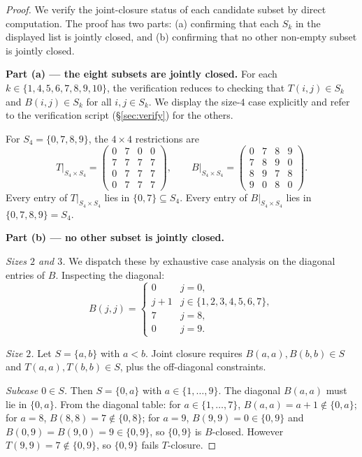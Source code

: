 \documentclass[11pt,reqno]{amsart}
\theoremstyle{plain}
\theoremstyle{definition}
\theoremstyle{remark}
\begin{document}
\begin{proof}
We verify the joint-closure status of each candidate subset by
direct computation. The proof has two parts: (a) confirming that
each $S_{k}$ in the displayed list is jointly closed, and (b)
confirming that no other non-empty subset is jointly closed.

\textbf{Part (a) --- the eight subsets are jointly closed.} For
each $k\in\{1,4,5,6,7,8,9,10\}$, the verification reduces to
checking that $T(i,j)\in S_{k}$ and $B(i,j)\in S_{k}$ for all
$i,j\in S_{k}$. We display the size-$4$ case explicitly and refer
to the verification script (\S\ref{sec:verify}) for the others.

For $S_{4}=\{0,7,8,9\}$, the $4\times 4$ restrictions are
\[
T\big|_{S_{4}\times S_{4}}=\begin{pmatrix}
0 & 7 & 0 & 0 \\
7 & 7 & 7 & 7 \\
0 & 7 & 7 & 7 \\
0 & 7 & 7 & 7
\end{pmatrix},
\qquad
B\big|_{S_{4}\times S_{4}}=\begin{pmatrix}
0 & 7 & 8 & 9 \\
7 & 8 & 9 & 0 \\
8 & 9 & 7 & 8 \\
9 & 0 & 8 & 0
\end{pmatrix}.
\]
Every entry of $T\big|_{S_{4}\times S_{4}}$ lies in
$\{0,7\}\subseteq S_{4}$. Every entry of
$B\big|_{S_{4}\times S_{4}}$ lies in $\{0,7,8,9\}=S_{4}$.

\textbf{Part (b) --- no other subset is jointly closed.}

\emph{Sizes $2$ and $3$.} We dispatch these by exhaustive case
analysis on the diagonal entries of $B$. Inspecting the diagonal:
\[
B(j,j)=\begin{cases}
0 & j=0,\\
j+1 & j\in\{1,2,3,4,5,6,7\},\\
7 & j=8,\\
0 & j=9.
\end{cases}
\]

\emph{Size $2$.} Let $S=\{a,b\}$ with $a<b$. Joint closure requires
$B(a,a),B(b,b)\in S$ and $T(a,a),T(b,b)\in S$, plus the off-diagonal
constraints.

\emph{Subcase $0\in S$.} Then $S=\{0,a\}$ with $a\in\{1,\dots,9\}$.
The diagonal $B(a,a)$ must lie in $\{0,a\}$. From the diagonal
table: for $a\in\{1,\dots,7\}$, $B(a,a)=a+1\notin\{0,a\}$; for
$a=8$, $B(8,8)=7\notin\{0,8\}$; for $a=9$, $B(9,9)=0\in\{0,9\}$ and
$B(0,9)=B(9,0)=9\in\{0,9\}$, so $\{0,9\}$ is $B$-closed. However
$T(9,9)=7\notin\{0,9\}$, so $\{0,9\}$ fails $T$-closure.


\end{proof}
\end{document}
